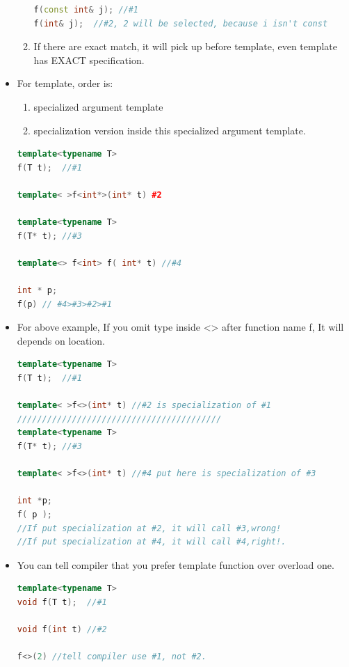 \documentclass[a4paper,11pt,twoside]{book}
\begin{document}
\begin{itemize}
\begin{enumerate}
\begin{lstlisting}[frame=single, language=c++]
f(const int& j); //#1
f(int& j);  //#2, 2 will be selected, because i isn't const
\end{lstlisting}
		\item If there are exact match, it will pick up before template, even template has EXACT specification.
\end{enumerate}

	\item For template, order is:
	\begin{enumerate}
		\item specialized argument template
		\item specialization version inside this specialized argument template.
	\end{enumerate}
\begin{lstlisting}[frame=single, language=c++]
template<typename T>
f(T t);  //#1

template< >f<int*>(int* t) #2

template<typename T>
f(T* t); //#3

template<> f<int> f( int* t) //#4

int * p;
f(p) // #4>#3>#2>#1
\end{lstlisting}

\item For above example, If you omit type inside <> after function name f, It will depends on location.
\begin{lstlisting}[frame=single, language=c++]
template<typename T>
f(T t);  //#1

template< >f<>(int* t) //#2 is specialization of #1
/////////////////////////////////////////
template<typename T>
f(T* t); //#3

template< >f<>(int* t) //#4 put here is specialization of #3

int *p; 
f( p ); 
//If put specialization at #2, it will call #3,wrong!
//If put specialization at #4, it will call #4,right!.
\end{lstlisting}

\item You can tell compiler that you prefer template function over overload one.

\begin{lstlisting}[frame=single, language=c++]
template<typename T>
void f(T t);  //#1

void f(int t) //#2

f<>(2) //tell compiler use #1, not #2.
\end{lstlisting}

\end{itemize}
\end{document}
